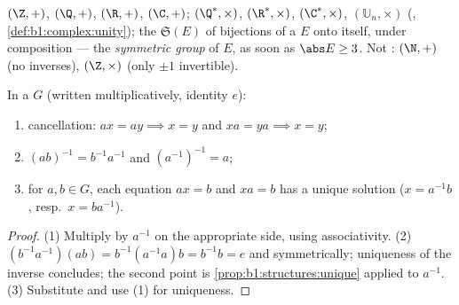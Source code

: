 \begin{example}\label{ex:b1:structures:groups}
$(\Z, +)$, $(\Q, +)$, $(\R, +)$, $(\C, +)$; $(\Q^*, \times)$,
$(\R^*, \times)$, $(\C^*, \times)$, $(\mathbb{U}_n, \times)$ (, \cref{def:b1:complex:unity}); the  $\mathfrak{S}(E)$ of
bijections of a  $E$ onto itself, under composition --- the
\emph{symmetric group} of $E$,  as
soon as $\abs E \geq 3$. Not : $(\N, +)$ (no inverses),
$(\Z, \times)$ (only $\pm 1$ invertible).
\end{example}

\begin{proposition}\label{prop:b1:structures:rules}
In a  $G$ (written multiplicatively, identity $e$):
\begin{enumerate}
  \item cancellation: $ax = ay \implies x = y$ and $xa = ya \implies
        x = y$;
  \item $(ab)^{-1} = b^{-1} a^{-1}$ and $(a^{-1})^{-1} = a$;
  \item for $a, b \in G$, each equation $ax = b$ and $xa = b$ has a
        unique solution ($x = a^{-1}b$, resp.\ $x = b a^{-1}$).
\end{enumerate}
\end{proposition}

\begin{proof}
(1) Multiply by $a^{-1}$ on the appropriate side, using
associativity. (2) $(b^{-1}a^{-1})(ab) = b^{-1}(a^{-1}a)b = b^{-1}b =
e$ and symmetrically; uniqueness of the inverse concludes; the second
point is \cref{prop:b1:structures:unique} applied to $a^{-1}$. (3)
Substitute and use (1) for uniqueness.
\end{proof}

